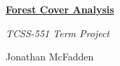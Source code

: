 \documentclass{article}[12pt]
\numberwithin{equation}{subsection}
\begin{document}
\begin{center}
\begin{Large} \textbf{\underline{Forest Cover Analysis}} \end{Large}
\end{center}

\begin{center}
\begin{large} \emph{TCSS-551 Term Project} \end{large}
\end{center}

\begin{center} Jonathan McFadden \end{center}


\vspace{1.5in}
\end{document}
